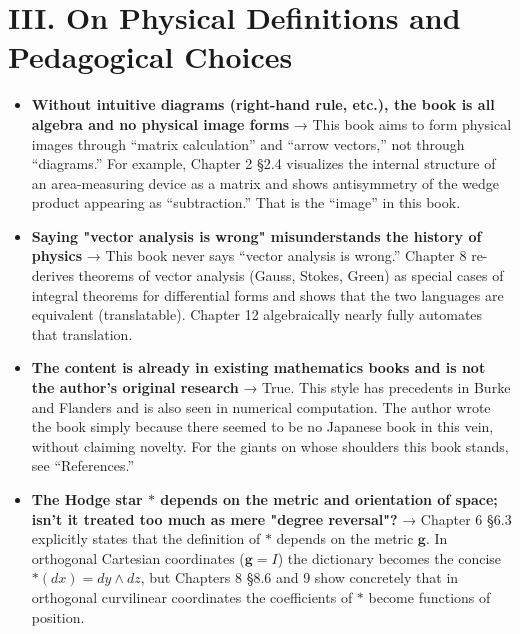\documentclass[a4paper,12pt,openany]{book}
\begin{document}
\par\vspace{0.35em}\par

\hypertarget{iii.-on-physical-definitions-and-pedagogical-choices}{%
\section{III. On Physical Definitions and Pedagogical
Choices}\label{iii.-on-physical-definitions-and-pedagogical-choices}}

\begin{itemize}
\item
  \textbf{Without intuitive diagrams (right-hand rule, etc.), the book is all algebra and no physical image forms}
  → This book aims to form physical images through ``matrix
  calculation'' and ``arrow vectors,'' not through ``diagrams.'' For
  example, Chapter 2 §2.4 visualizes the internal structure of an
  area-measuring device as a matrix and shows antisymmetry of the wedge
  product appearing as ``subtraction.'' That is the ``image'' in this
  book.
\item
  \textbf{Saying "vector analysis is wrong" misunderstands the history of physics}
  → This book never says ``vector analysis is wrong.'' Chapter 8
  re-derives theorems of vector analysis (Gauss, Stokes, Green) as
  special cases of integral theorems for differential forms and shows
  that the two languages are equivalent (translatable). Chapter 12
  algebraically nearly fully automates that translation.
\item
  \textbf{The content is already in existing mathematics books and is not the author's original research}
  → True. This style has precedents in Burke and Flanders and is also
  seen in numerical computation. The author wrote the book simply
  because there seemed to be no Japanese book in this vein, without
  claiming novelty. For the giants on whose shoulders this book stands,
  see ``References.''
\item
  \textbf{The Hodge star $\ast$ depends on the metric and orientation of space; isn't it treated too much as mere "degree reversal"?}
  → Chapter 6 §6.3 explicitly states that the definition of \(\ast\)
  depends on the metric \(\mathbf{g}\). In orthogonal Cartesian
  coordinates (\(\mathbf{g}=I\)) the dictionary becomes the concise
  \(\ast(dx)=dy\wedge dz\), but Chapters 8 §8.6 and 9 show concretely
  that in orthogonal curvilinear coordinates the coefficients of
  \(\ast\) become functions of position.

\end{itemize}
\end{document}
